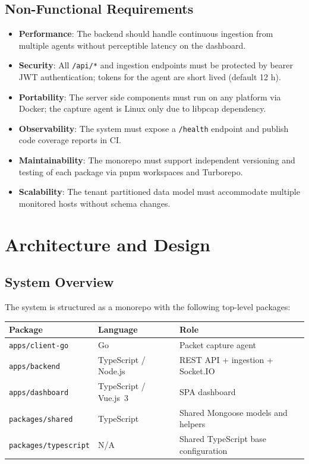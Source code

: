 \documentclass[12pt]{report}
\begin{document}
\section{Non-Functional Requirements}

\begin{itemize}
    \item \textbf{Performance}: The backend should handle continuous ingestion from multiple
          agents without perceptible latency on the dashboard.
    \item \textbf{Security}: All \texttt{/api/*} and ingestion endpoints must be protected by
          bearer JWT authentication; tokens for the agent are short lived (default 12 h).
    \item \textbf{Portability}: The server side components must run on any platform via Docker;
          the capture agent is Linux only due to libpcap dependency.
    \item \textbf{Observability}: The system must expose a \texttt{/health} endpoint and
          publish code coverage reports in CI.
    \item \textbf{Maintainability}: The monorepo must support independent versioning and
          testing of each package via pnpm workspaces and Turborepo.
    \item \textbf{Scalability}: The tenant partitioned data model must accommodate multiple
          monitored hosts without schema changes.
\end{itemize}

\chapter{Architecture and Design}
\label{ch:design}

\section{System Overview}

The system is structured as a monorepo with the following top-level packages:

\begin{center}
\begin{tabular}{lll}
\toprule
\textbf{Package} & \textbf{Language} & \textbf{Role} \\
\midrule
\texttt{apps/client-go}   & Go              & Packet capture agent \\
\texttt{apps/backend}     & TypeScript / Node.js & REST API + ingestion + Socket.IO \\
\texttt{apps/dashboard}   & TypeScript / Vue.js~3 & SPA dashboard \\
\texttt{packages/shared}  & TypeScript      & Shared Mongoose models and helpers \\
\texttt{packages/typescript} & N/A          & Shared TypeScript base configuration \\
\bottomrule
\end{tabular}
\end{center}
\end{document}
